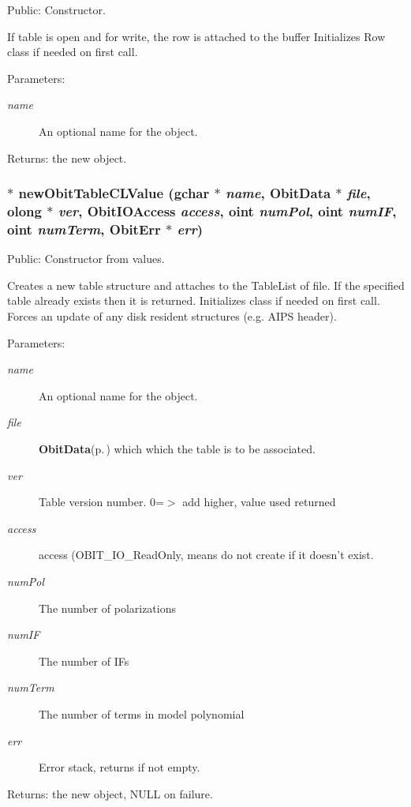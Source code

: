 Public: Constructor. 

If table is open and for write, the row is attached to the buffer Initializes Row class if needed on first call. \begin{Desc}
\item[Parameters:]
\begin{description}
\item[{\em name}]An optional name for the object. \end{description}
\end{Desc}
\begin{Desc}
\item[Returns:]the new object. \end{Desc}
\subsubsection{$\ast$ new\-Obit\-Table\-CLValue (gchar $\ast$ {\em name}, {\bf Obit\-Data} $\ast$ {\em file}, {\bf olong} $\ast$ {\em ver}, Obit\-IOAccess {\em access}, {\bf oint} {\em num\-Pol}, {\bf oint} {\em num\-IF}, {\bf oint} {\em num\-Term}, {\bf Obit\-Err} $\ast$ {\em err})}\label{ObitTableCL_8h_a12}


Public: Constructor from values. 

Creates a new table structure and attaches to the Table\-List of file. If the specified table already exists then it is returned. Initializes class if needed on first call. Forces an update of any disk resident structures (e.g. AIPS header). \begin{Desc}
\item[Parameters:]
\begin{description}
\item[{\em name}]An optional name for the object. \item[{\em file}]{\bf Obit\-Data}{\rm (p.\,\pageref{structObitData})} which which the table is to be associated. \item[{\em ver}]Table version number. 0=$>$ add higher, value used returned \item[{\em access}]access (OBIT\_\-IO\_\-Read\-Only, means do not create if it doesn't exist. \item[{\em num\-Pol}]The number of polarizations \item[{\em num\-IF}]The number of IFs \item[{\em num\-Term}]The number of terms in model polynomial \item[{\em err}]Error stack, returns if not empty. \end{description}
\end{Desc}
\begin{Desc}
\item[Returns:]the new object, NULL on failure. \end{Desc}
